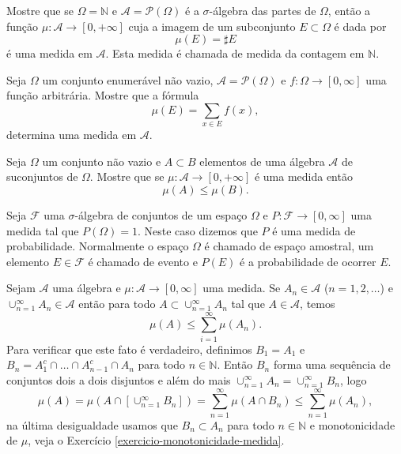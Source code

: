\begin{exercicio}
 Mostre que se $\Omega=\mathbb{N}$ e $\mathcal{A}= \mathcal{P}(\Omega) $ é a $\sigma$-álgebra das partes de 
 $\Omega$, então a função $\mu:\mathcal{A}\to [0,+\infty]$ cuja a imagem de um subconjunto 
 $E\subset\Omega$ é dada por 
 \[
     \mu(E)=\sharp E
 \]
 é uma medida em $\mathcal{A}$. Esta medida é chamada de medida da contagem em $\mathbb{N}$.
\end{exercicio}

\begin{exercicio}
	Seja $\Omega$ um conjunto enumerável não vazio, $\mathcal{A}=\mathcal{P}(\Omega)$ e
	 $f:\Omega\to [0,\infty]$ 
	uma função arbitrária. Mostre que a fórmula 
	\[
	    \mu(E)=\sum_{x\in E} f(x),
	\]
	determina uma medida em $\mathcal{A}$.
\end{exercicio}



\begin{exercicio}
\label{exercicio-monotonicidade-medida}
	Seja $\Omega$ um conjunto não vazio e 
	$A\subset B$ elementos de uma álgebra 
	$\mathcal{A}$ de suconjuntos de $\Omega$.
	Mostre que se $\mu:\mathcal{A}\to [0,+\infty]$ é 
	uma medida então
	\[
		\mu(A)\leq \mu(B).
	\] 
\end{exercicio}



\begin{definicao}
Seja $\mathcal{F}$ uma $\sigma$-álgebra de conjuntos de um espaço $\Omega$ e 
$P:\mathcal{F}\to [0,\infty]$ uma medida tal que $P(\Omega)=1$.
Neste caso dizemos que $P$ é uma medida de probabilidade. 
Normalmente o espaço $\Omega$
é chamado de espaço amostral, um elemento $E\in\mathcal{F}$ é chamado
de evento e $P(E)$ é a probabilidade de ocorrer $E$.
\end{definicao}


Sejam $\mathcal{A}$ uma álgebra e $\mu:\mathcal{A}\to [0,\infty]$ uma medida.
Se $A_n\in\mathcal{A}$ ($n=1,2,\ldots$) e
$\cup_{n=1}^{\infty} A_n\in\mathcal{A}$ 
então para todo $A\subset \cup_{n=1}^{\infty} A_n$ tal que $A\in\mathcal{A}$, temos 
$$
\mu(A) \leq \sum_{i=1}^{\infty} \mu(A_n).
$$
Para verificar que este fato é verdadeiro, definimos $B_1=A_1$
e $B_n = A_1^c\cap \ldots \cap A_{n-1}^c\cap A_n$ para todo $n\in\mathbb{N}$.
Então $B_n$ forma uma sequência de conjuntos dois a dois disjuntos e além do
mais $\cup_{n=1}^{\infty} A_n=\cup_{n=1}^{\infty} B_n$, logo 
$$
\mu(A) 	= \mu(A\cap [\cup_{n=1}^{\infty} B_n])
		= \sum_{n=1}^{\infty} \mu(A\cap B_n)
		\leq \sum_{n=1}^{\infty} \mu(A_n),
$$
na última desigualdade usamos que $B_n\subset A_n$ para todo $n\in\mathbb{N}$
e monotonicidade de $\mu$, veja o 
Exercício \ref{exercicio-monotonicidade-medida}. 



